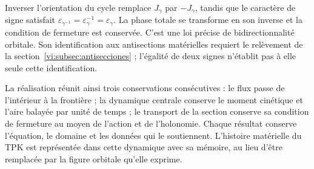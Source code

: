 Inverser l’orientation du cycle remplace $J_\gamma$ par
$-J_\gamma$, tandis que le caractère de signe satisfait
$\varepsilon_{\gamma^{-1}}=\varepsilon_\gamma^{-1}
=\varepsilon_\gamma$. La phase totale se transforme en son
inverse et la condition de fermeture est conservée. C’est une
loi précise de bidirectionnalité orbitale. Son identification
aux antisections matérielles requiert le relèvement
de la section~\ref{vi:subsec:antisecciones} ; l’égalité
de deux signes n’établit pas à elle seule cette identification.


La réalisation réunit ainsi trois conservations
consécutives : le flux passe de l’intérieur à la frontière ;
la dynamique centrale conserve le moment cinétique et l’aire
balayée par unité de temps ; le transport de la section
conserve sa condition de fermeture au moyen de l’action et de
l’holonomie. Chaque résultat conserve l’équation, le domaine
et les données qui le soutiennent. L’histoire matérielle du
TPK est représentée dans cette dynamique avec sa mémoire, au lieu
d’être remplacée par la figure orbitale qu’elle exprime.

